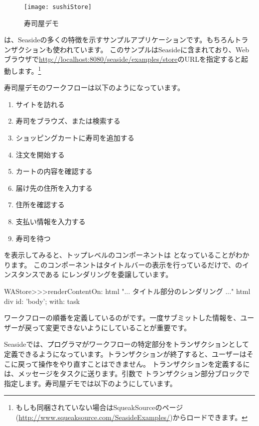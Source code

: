 \documentclass[a4paper,10pt,twoside]{book}
\begin{document}
\begin{figure}[ht]
\begin{center}
\texttt{[image: sushiStore]}
\caption{寿司屋デモ}
\end{center}
\end{figure}

 は、Seasideの多くの特徴を示すサンプルアプリケーションです。もちろんトランザクションも使われています。
このサンプルはSeasideに含まれており、Webブラウザで\url{http://localhost:8080/seaside/examples/store}のURLを指定すると起動します。\footnote{もしも同梱されていない場合はSqueakSourceのページ(\url{http://www.squeaksource.com/SeasideExamples/})からロードできます。 }

寿司屋デモのワークフローは以下のようになっています。
\begin{enumerate}[itemsep=0pt]
  \item サイトを訪れる
  \item 寿司をブラウズ、または検索する
  \item ショッピングカートに寿司を追加する
  \item 注文を開始する
  \item カートの内容を確認する
  \item 届け先の住所を入力する
  \item 住所を確認する
  \item 支払い情報を入力する
  \item 寿司を待つ
\end{enumerate}

を表示してみると、トップレベルのコンポーネントは となっていることがわかります。
このコンポーネントはタイトルバーの表示を行っているだけで、のインスタンスである にレンダリングを委譲しています。

\begin{code}{}
WAStore>>>renderContentOn: html
	"... タイトル部分のレンダリング ..."
	html div id: 'body'; with: task
\end{code}

ワークフローの順番を定義しているのがです。一度サブミットした情報を、ユーザーが戻って変更できないようにしていることが重要です。


Seasideでは、プログラマがワークフローの特定部分をトランザクションとして定義できるようになっています。トランザクションが終了すると、ユーザーはそこに戻って操作をやり直すことはできません。
トランザクションを定義するには、メッセージをタスクに送ります。引数で
トランザクション部分ブロックで指定します。寿司屋デモでは以下のようにしています。
\end{document}
